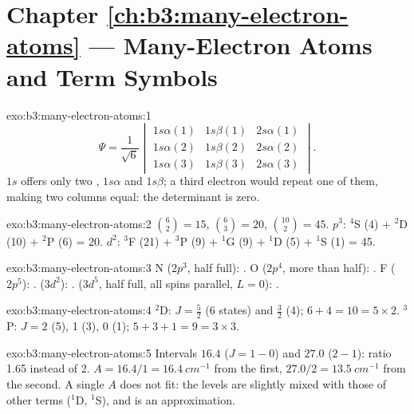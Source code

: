 \section*{Chapter \ref{ch:b3:many-electron-atoms} --- Many-Electron Atoms and Term Symbols}

\begin{solution}{exo:b3:many-electron-atoms:1}
\[
\Psi = \frac{1}{\sqrt6}\begin{vmatrix}1s\alpha(1) & 1s\beta(1) & 2s\alpha(1)\\
1s\alpha(2) & 1s\beta(2) & 2s\alpha(2)\\ 1s\alpha(3) & 1s\beta(3) & 2s\alpha(3)
\end{vmatrix}.
\]
$1s$ offers only two , $1s\alpha$ and $1s\beta$; a third electron
would repeat one of them, making two columns equal: the determinant is zero.
\end{solution}

\begin{solution}{exo:b3:many-electron-atoms:2}
$\binom62 = 15$, $\binom63 = 20$, $\binom{10}{2} = 45$. $p^3$: ${}^4$S (4) +
${}^2$D (10) + ${}^2$P (6) = 20. $d^2$: ${}^3$F (21) + ${}^3$P (9) + ${}^1$G (9) +
${}^1$D (5) + ${}^1$S (1) = 45.
\end{solution}

\begin{solution}{exo:b3:many-electron-atoms:3}
N ($2p^3$, half full): . O ($2p^4$, more than half):
. F ($2p^5$): .  ($3d^2$):
.  ($3d^5$, half full, all spins parallel, $L = 0$):
.
\end{solution}

\begin{solution}{exo:b3:many-electron-atoms:4}
${}^2$D: $J = \frac52$ (6 states) and $\frac32$ (4); $6 + 4 = 10 = 5 \times 2$.
${}^3$P: $J = 2$ (5), 1 (3), 0 (1); $5 + 3 + 1 = 9 = 3 \times 3$.
\end{solution}

\begin{solution}{exo:b3:many-electron-atoms:5}
Intervals $16.4$ ($J = 1 - 0$) and $27.0$ ($2 - 1$): ratio 1.65 instead of 2.
$A = 16.4/1 = \qty{16.4}{cm^{-1}}$ from the first, $27.0/2 = \qty{13.5}{cm^{-1}}$
from the second. A single $A$ does not fit: the levels are slightly mixed with
those of other terms (${}^1$D, ${}^1$S), and  is an
approximation.
\end{solution}


